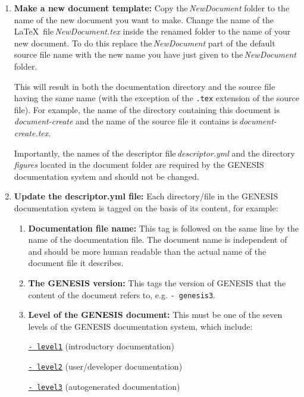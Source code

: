 \documentclass[12pt]{article}
\begin{document}
\begin{enumerate}

\item {\bf Make a new document template:} Copy the\,{\it NewDocument} folder to the name of the new document you want to make. Change the name of the \LaTeX\,\,\,file\,{\it NewDocument.tex} inside the renamed folder to the name of your new document. To do this replace the\,{\it NewDocument} part of the default source file name with the new name you have just given to the\,{\it NewDocument} folder.

This will result in both the documentation directory and the source file having the same name (with the exception of the {\tt .tex} extension of the source file). For example, the name of the directory containing this document is {\it document-create} and the name of the source file it contains is\,{\it document-create.tex}.

Importantly, the names of the descriptor file\,{\it descriptor.yml} and the directory\,{\it figures} located in the document folder are required by the GENESIS documentation system and should not be changed.

\item {\bf Update the descriptor.yml file:} Each directory/file in the GENESIS documentation system is tagged on the basis of its content, for example:

\begin{enumerate}

\item {\bf Documentation file name:}  This tag is followed on the same line by the name of the documentation file. The document name is independent of and should be more human readable than the actual name of the document file it describes.

\item  {\bf The GENESIS version:} This tags the version of GENESIS that the content of the document refers to, e.g. {\tt -\,genesis3}.

\item {\bf Level of the GENESIS document:} This must be one of the seven levels of the GENESIS documentation system, which include:

\href{../contents-level1/contents-level1.pdf}{{\tt - level1}} (introductory documentation)

\href{../contents-level2/contents-level2.pdf}{{\tt - level2}} (user/developer documentation)

\href{../contents-level3/contents-level3.pdf}{{\tt - level3}} (autogenerated documentation)


\end{enumerate}
\end{enumerate}
\end{document}
